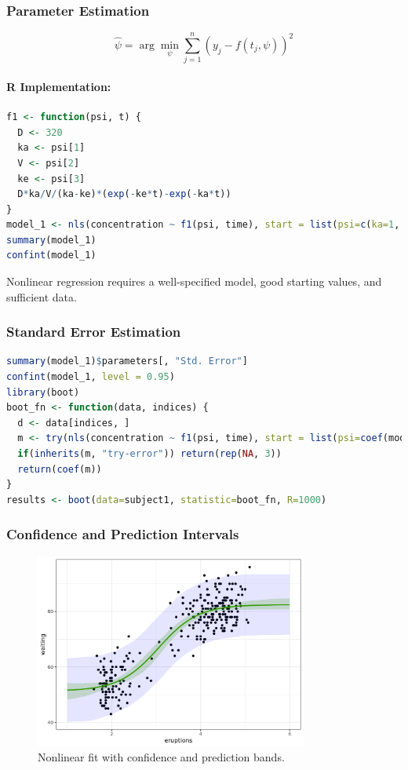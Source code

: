 \documentclass[11pt,a4paper]{article}
\begin{document}
\subsubsection{Parameter Estimation}
\begin{equation}
\hat{\psi} = \arg\min_{\psi} \sum_{j=1}^n (y_j - f(t_j, \psi))^2
\end{equation}

\paragraph{R Implementation:}
\begin{lstlisting}[language=R]
f1 <- function(psi, t) {
  D <- 320  
  ka <- psi[1]
  V <- psi[2]
  ke <- psi[3]
  D*ka/V/(ka-ke)*(exp(-ke*t)-exp(-ka*t))
}
model_1 <- nls(concentration ~ f1(psi, time), start = list(psi=c(ka=1, V=40, ke=0.1)), data=subject1)
summary(model_1)
confint(model_1)
\end{lstlisting}

\begin{notebox}
Nonlinear regression requires a well-specified model, good starting values, and sufficient data.
\end{notebox}

\subsubsection{Standard Error Estimation}
\begin{lstlisting}[language=R]
summary(model_1)$parameters[, "Std. Error"]
confint(model_1, level = 0.95)
library(boot)
boot_fn <- function(data, indices) {
  d <- data[indices, ]
  m <- try(nls(concentration ~ f1(psi, time), start = list(psi=coef(model_1)), data=d), silent=TRUE)
  if(inherits(m, "try-error")) return(rep(NA, 3))
  return(coef(m))
}
results <- boot(data=subject1, statistic=boot_fn, R=1000)
\end{lstlisting}

\subsubsection{Confidence and Prediction Intervals}
\begin{figure}[htb]
    \centering
    \includegraphics[width=0.8\textwidth]{confidence-prediction-bands.png}
    \caption{Nonlinear fit with confidence and prediction bands.}
    \label{fig:conf-pred-bands}
\end{figure}
\end{document}

